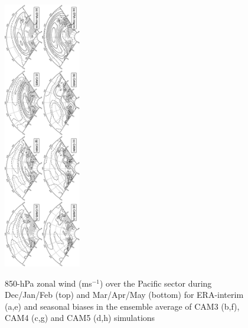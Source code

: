 \documentclass[12pt,varwidth]{article}
\begin{document}
\begin{figure}[t]
  \begin{center}
    \noindent\includegraphics[width=0.3\textwidth,angle=90.]{./figs/f_mean_U850_pac.pdf}\\
  \end{center}
  \caption{850-hPa zonal wind (ms$^{-1}$) over the Pacific sector during Dec/Jan/Feb (top) and Mar/Apr/May (bottom) for ERA-interim (a,e) and seasonal biases in the ensemble average of CAM3 (b,f), CAM4 (c,g) and CAM5 (d,h) simulations}
\label{f_mean_U850_pac}
\end{figure}
\end{document}
